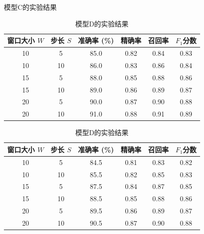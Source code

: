 \begin{table}[htbp]
    \ContinuedFloat
    \centering

    \begin{subtable}{\linewidth}
        \centering
        \caption{模型C的实验结果}
        \begin{tabular}{cc|cccc}
            \toprule
            窗口大小 $W$ & 步长 $S$ & 准确率 (\%) & 精确率 & 召回率 & $F_1$分数 \\
            \midrule
            10 & 5 & 85.0 & 0.82 & 0.84 & 0.83 \\
            10 & 10 & 86.0 & 0.83 & 0.86 & 0.84 \\
            15 & 5 & 88.0 & 0.85 & 0.88 & 0.86 \\
            15 & 10 & 89.0 & 0.86 & 0.89 & 0.87 \\
            20 & 5 & 90.0 & 0.87 & 0.90 & 0.88 \\
            20 & 10 & 91.0 & 0.88 & 0.91 & 0.89 \\
            \bottomrule
        \end{tabular}
        \label{tab:modelC_performance}
    \end{subtable}

    \vspace{0.4cm}

    \begin{subtable}{\linewidth}
        \centering
        \caption{模型D的实验结果}
        \begin{tabular}{cc|cccc}
            \toprule
            窗口大小 $W$ & 步长 $S$ & 准确率 (\%) & 精确率 & 召回率 & $F_1$分数 \\
            \midrule
            10 & 5 & 84.5 & 0.81 & 0.83 & 0.82 \\
            10 & 10 & 85.5 & 0.82 & 0.85 & 0.83 \\
            15 & 5 & 87.5 & 0.84 & 0.87 & 0.85 \\
            15 & 10 & 88.5 & 0.85 & 0.88 & 0.86 \\
            20 & 5 & 89.5 & 0.86 & 0.89 & 0.87 \\
            20 & 10 & 90.5 & 0.87 & 0.90 & 0.88 \\
            \bottomrule
        \end{tabular}
        \label{tab:modelD_performance}
    \end{subtable}

    \vspace{0.4cm}


\end{table}
